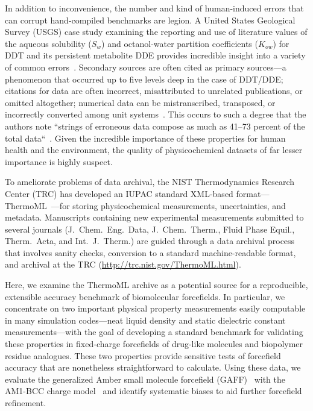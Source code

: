 \documentclass[aip, jcp, reprint]{revtex4-1}  %
\begin{document}
In addition to inconvenience, the number and kind of human-induced errors that can corrupt hand-compiled benchmarks are legion.
A United States Geological Survey (USGS) case study examining the reporting and use of literature values of the aqueous solubility ($S_w$) and octanol-water partition coefficients ($K_{ow}$) for DDT and its persistent metabolite DDE provides incredible insight into a variety of common errors~\cite{usgs-ddt-report}.
Secondary sources are often cited as primary sources---a phenomenon that occurred up to five levels deep in the case of DDT/DDE;
citations for data are often incorrect, misattributed to unrelated publications, or omitted altogether;
numerical data can be mistranscribed, transposed, or incorrectly converted among unit systems~\cite{usgs-ddt-report}.
This occurs to such a degree that the authors note ``strings of erroneous data compose as much as 41--73 percent of the total data``~\cite{usgs-ddt-report}.
Given the incredible importance of these properties for human health and the environment, the quality of physicochemical datasets of far lesser importance is highly suspect.

To ameliorate problems of data archival, the NIST Thermodynamics Research Center (TRC) has developed an IUPAC standard XML-based format---ThermoML~\cite{frenkel2003thermoml, frenkel2006xml, chirico2013improvement}---for storing physicochemical measurements, uncertainties, and metadata.
Manuscripts containing new experimental measurements submitted to several journals (J.~Chem.~Eng.~Data, J.~Chem.~Therm., Fluid Phase Equil., Therm.~Acta, and Int.~J.~Therm.) are guided through a data archival process that involves sanity checks, conversion to a standard machine-readable format, and archival at the TRC (\url{http://trc.nist.gov/ThermoML.html}).  

Here, we examine the ThermoML archive as a potential source for a reproducible, extensible accuracy benchmark of biomolecular forcefields.
In particular, we concentrate on two important physical property measurements easily computable in many simulation codes---neat liquid density and static dielectric constant measurements---with the goal of developing a standard benchmark for validating these properties in fixed-charge forcefields of drug-like molecules and biopolymer residue analogues.  
These two properties provide sensitive tests of forcefield accuracy that are nonetheless straightforward to calculate.  
Using these data, we evaluate the generalized Amber small molecule forcefield (GAFF)~\cite{gaff,gaff2} with the AM1-BCC charge model~\cite{am1bcc1,am1bcc2} and identify systematic biases to aid further forcefield refinement.
\end{document}

